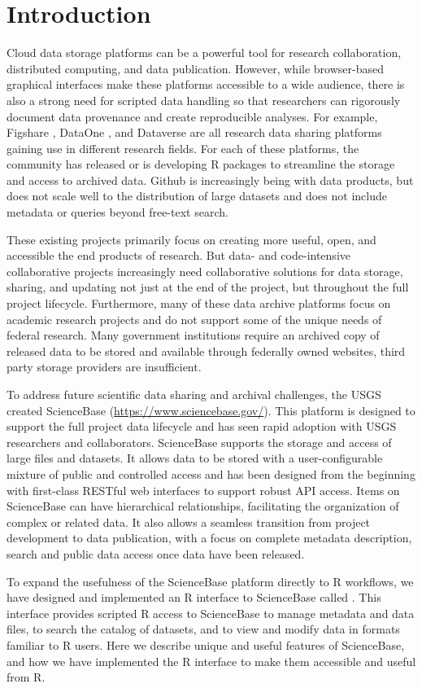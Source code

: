 \section{Introduction}

Cloud data storage platforms can be a powerful tool for research collaboration,
distributed computing, and data publication. However, while browser-based graphical
interfaces make these platforms accessible to a wide audience, there is also
a strong need for scripted data handling so that researchers can rigorously
document data provenance and create reproducible analyses. For example,
Figshare , DataOne , and Dataverse  
are all research data
sharing platforms gaining use in different research fields. For each of these
platforms, the community has released \citep{rfigshare, dvn} or is
developing \citep{dataone} R packages to streamline the storage and access
to archived data. Github is increasingly being with data products, 
but does not scale well to the distribution of large datasets and does not
include metadata or queries beyond free-text search.

These existing projects primarily focus on creating more useful, open, and
accessible the end products of research. But data- and code-intensive collaborative projects
increasingly need collaborative solutions for data storage, sharing, and updating
not just at the end of the project, but throughout the full project lifecycle. 
Furthermore, many of these data
archive platforms focus on academic research projects and do not support some
of the unique needs of federal research. Many government institutions
require an archived copy of released data to be stored and available through federally
owned websites, third party storage providers are insufficient.

To address future scientific data sharing and archival challenges, the USGS
created ScienceBase (\url{https://www.sciencebase.gov/}). This platform is
designed to support
the full project data lifecycle and has seen rapid adoption with USGS
researchers and collaborators. ScienceBase supports the storage and access
of large files and datasets. It allows data to be stored with a user-configurable 
mixture of
public and controlled access and has been designed from the beginning with
first-class RESTful web interfaces to support robust API access. Items on ScienceBase 
can have hierarchical relationships, facilitating the organization of complex or related
data. It also allows
a seamless transition from project development to data publication, with
a focus on complete metadata description, search and public data access once 
data have been released.

To expand the usefulness of the ScienceBase platform directly to R workflows, 
we have designed and
implemented an R interface to ScienceBase called .
This interface provides scripted R access to ScienceBase to manage metadata and
data files, to search the catalog of datasets, and to view and modify data in
formats familiar to R users.
Here we describe unique and useful features of ScienceBase, and how we have
implemented the R interface to make them accessible and useful from R.
